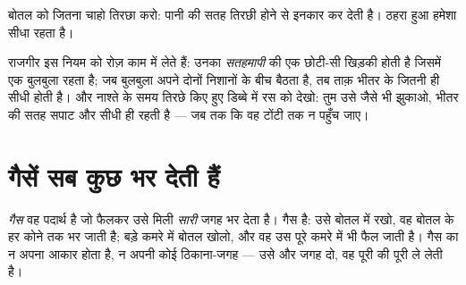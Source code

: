 \begin{omfigure}

{\small बोतल को जितना चाहो तिरछा करो: पानी की सतह तिरछी होने से इनकार
कर देती है। ठहरा हुआ  हमेशा सीधा रहता है।}
\end{omfigure}

\begin{example}[सीधापन काम पर]\label{ex:g3:solids-liquids-gases:level}
राजगीर इस नियम को रोज़ काम में लेते हैं: उनका \emph{सतहमापी}  की
एक छोटी-सी खिड़की होती है जिसमें एक बुलबुला रहता है; जब बुलबुला अपने
दोनों निशानों के बीच बैठता है, तब ताक़ भीतर के  जितनी ही सीधी
होती है। और नाश्ते के समय तिरछे किए हुए डिब्बे में रस को देखो: तुम
उसे जैसे भी झुकाओ, भीतर की सतह सपाट और सीधी ही रहती है --- जब तक कि
वह टोंटी तक न पहुँच जाए।
\end{example}

\section{गैसें सब कुछ भर देती हैं}

\begin{definition}[गैस]\label{def:g3:solids-liquids-gases:gas}
\emph{गैस} वह पदार्थ है जो फैलकर उसे मिली \emph{सारी} जगह
भर देता है।  गैस है: उसे बोतल में रखो, वह बोतल के हर कोने तक भर
जाती है; बड़े कमरे में बोतल खोलो, और वह उस पूरे कमरे में भी फैल जाती
है। गैस का न अपना आकार होता है, न अपनी कोई ठिकाना-जगह --- उसे और जगह
दो, वह पूरी की पूरी ले लेती है।
\end{definition}

